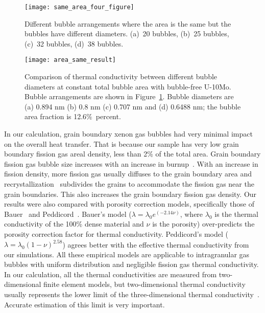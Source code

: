  
\begin{figure}
	\centering
	\texttt{[image: same\_area\_four\_figure]}
    \caption[Different bubble arrangements where the area is the same but the
      bubbles have different diameters.]{Different bubble arrangements where the area is the same but the
      bubbles have different diameters. (a)~20 bubbles, (b)~25 bubbles,
      (c)~32 bubbles, (d)~38 bubbles.}
	\label{fig:area_same_four}
\end{figure}
\begin{figure}
	\centering
	\texttt{[image: area\_same\_result]}
	\caption[Comparison of thermal conductivity between different bubble 
      diameters at constant total bubble area with bubble-free U-10Mo.]{Comparison of thermal conductivity between different bubble 
      diameters at constant total bubble area with bubble-free U-10Mo. Bubble
      arrangements are shown in Figure~\ref{fig:area_same_four}.
      Bubble diameters are (a) 0.894 nm (b) 0.8 nm (c) 0.707 nm and (d) 0.6488 nm;
      the bubble area fraction is 12.6$\%$~percent.}
	\label{fig:four_results}
\end{figure}

In our calculation, grain boundary xenon gas bubbles had very minimal impact on the overall heat transfer. That is because our sample has very low grain boundary fission gas areal density, less than 2$\%$ of the total area. Grain boundary fission gas bubble size increases with an increase in burnup~\cite{kim2011fission}.
With an increase in fission density, more fission gas usually diffuses to the grain boundary area and recrystallization~\cite{kim2013recrystallization} subdivides the grains to accommodate the fission gas near the grain boundaries.
This also increases the grain boundary fission gas density. Our results were also compared with porosity correction models, specifically those of Bauer~\cite{bauer1995pile} and Peddicord~\cite{peddicord1978porosity}. Bauer's model ($\lambda=\lambda_0 e^{(-2.14\nu)}$, where $\lambda_0$ is the thermal conductivity of the 100\% dense material and $\nu$ is the porosity) over-predicts the porosity correction factor for thermal conductivity. Peddicord's model ($\lambda=\lambda_0(1-\nu)^{2.58}$) agrees better with the effective thermal conductivity from our simulations. All these empirical models are applicable to intragranular gas bubbles with uniform distribution and negligible fission gas thermal conductivity. In our calculation, all the thermal conductivities are measured from two-dimensional finite element models, but two-dimensional thermal conductivity usually represents the lower limit of the three-dimensional thermal conductivity~\cite{bakker1995determination}. Accurate estimation of this limit is very important. 


